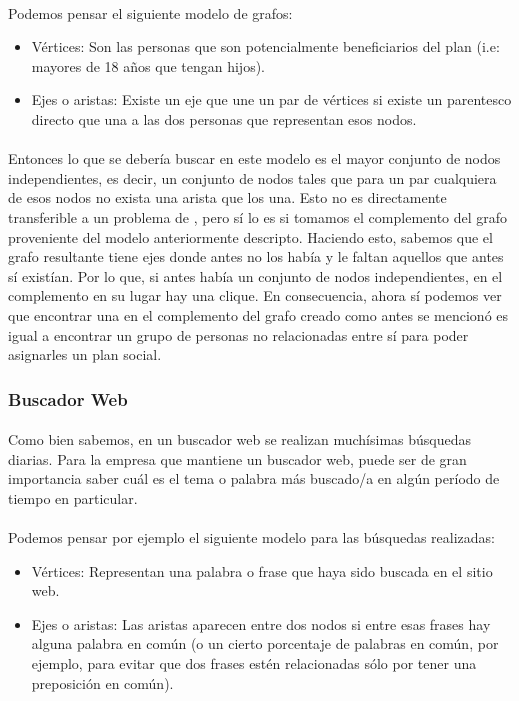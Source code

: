 \paragraph{}
Podemos pensar el siguiente modelo de grafos:
\begin{itemize}
  \item Vértices: Son las personas que son potencialmente beneficiarios del plan (i.e: mayores de 18 años que tengan hijos).
  \item Ejes o aristas: Existe un eje que une un par de vértices si existe un parentesco directo que una a las dos personas que representan esos nodos.
\end{itemize}

\paragraph{}
Entonces lo que se debería buscar en este modelo es el mayor conjunto de nodos independientes, es decir, un conjunto de nodos tales que para un par cualquiera de esos nodos no exista una arista que los una. Esto no es directamente transferible a un problema de \mc, pero sí lo es si tomamos el complemento del grafo proveniente del modelo anteriormente descripto. Haciendo esto, sabemos que el grafo resultante tiene ejes donde antes no los había y le faltan aquellos que antes sí existían. Por lo que, si antes había un conjunto de nodos independientes, en el complemento en su lugar hay una clique. En consecuencia, ahora sí podemos ver que encontrar una \mc en el complemento del grafo creado como antes se mencionó es igual a encontrar un grupo de personas no relacionadas entre sí para poder asignarles un plan social.

\subsubsection{Buscador Web}

\paragraph{}
Como bien sabemos, en un buscador web se realizan muchísimas búsquedas diarias. Para la empresa que mantiene un buscador web, puede ser de gran importancia saber cuál es el tema o palabra más buscado/a en algún período de tiempo en particular. 

\paragraph{}
Podemos pensar por ejemplo el siguiente modelo para las búsquedas realizadas:
\begin{itemize}
  \item Vértices: Representan una palabra o frase que haya sido buscada en el sitio web.
  \item Ejes o aristas: Las aristas aparecen entre dos nodos si entre esas frases hay alguna palabra en común (o un cierto porcentaje de palabras en común, por ejemplo, para evitar que dos frases estén relacionadas sólo por tener una preposición en común).
\end{itemize}

